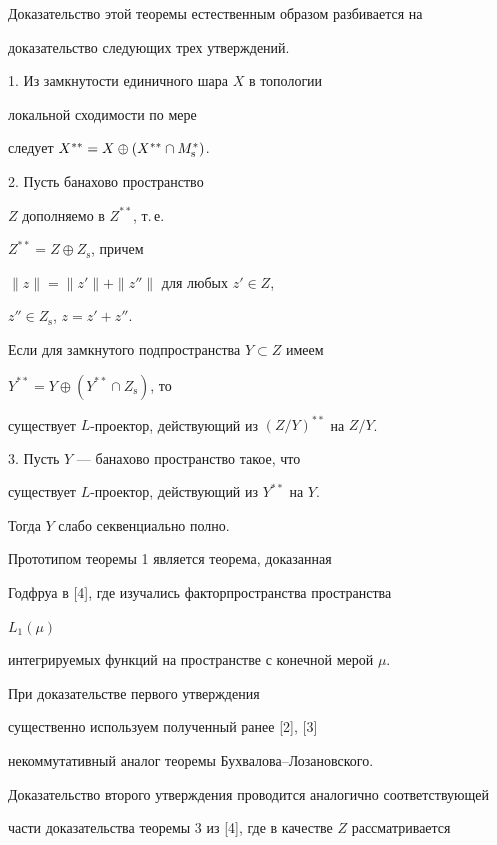 Доказательство этой теоремы естественным образом разбивается на 


доказательство следующих трех утверждений.





1. Из замкнутости единичного шара ${X}$ в топологии


локальной сходимости по мере


следует $X^{**} = X\oplus (X^{**}\cap M^*_{\rm s})$.





2. Пусть банахово пространство


$Z$ дополняемо в $Z^{**}$, т.\,е.


$Z^{**} = Z \oplus Z_{\mathrm s}$, причем


$\| z \| = \| z' \| + \| z'' \|$ для любых $z' \in Z$,


$z'' \in Z_{\mathrm s}$, $z=z'+z''$.


Если для замкнутого подпространства $Y\subset Z$ имеем


$Y^{**} = Y \oplus (Y^{**} \cap Z_{\mathrm s})$, то


существует $L$-проектор, действующий из $(Z/Y)^{**}$ на $Z/Y$.





3. Пусть $Y$ --- банахово пространство такое, что


существует $L$-проектор, действующий из $Y^{**}$ на $Y$.


Тогда $Y$ слабо секвенциально полно.





Прототипом теоремы 1 является теорема, доказанная


Годфруа в [4], где изучались факторпространства пространства


$L_1 (\mu )$


интегрируемых функций на пространстве с конечной мерой $\mu$.


При доказательстве первого утверждения


существенно используем полученный ранее [2], [3]


некоммутативный аналог теоремы Бухвалова--Лозановского.


Доказательство второго утверждения проводится аналогично соответствующей


части доказательства теоремы 3 из [4], где в качестве $Z$ рассматривается


